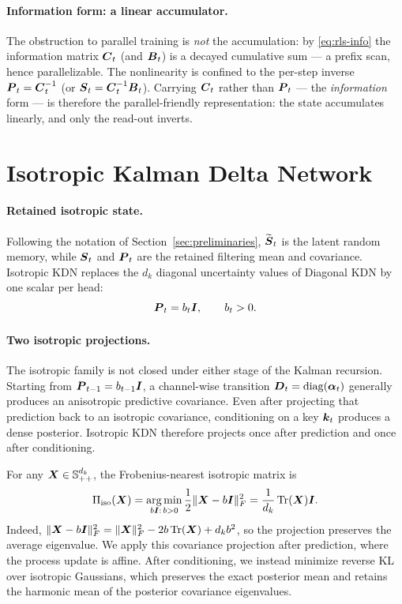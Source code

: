 \documentclass[11pt,letterpaper,logo]{yalearxiv}
\begin{document}
\paragraph{Information form: a linear accumulator.}
The obstruction to parallel training is \emph{not} the accumulation: by \eqref{eq:rls-info}
the information matrix $\boldsymbol{C}_t$ (and $\boldsymbol{B}_t$) is a decayed cumulative sum --- a prefix scan, hence
parallelizable. The nonlinearity is confined to the per-step inverse $\boldsymbol{P}_t=\boldsymbol{C}_t^{-1}$ (or
$\boldsymbol{S}_t=\boldsymbol{C}_t^{-1}\boldsymbol{B}_t$). Carrying $\boldsymbol{C}_t$ rather than $\boldsymbol{P}_t$ --- the \emph{information} form --- is
therefore the parallel-friendly representation: the state accumulates linearly, and only the
read-out inverts.
\fi

\section{Isotropic Kalman Delta Network}
\label{app:iso-kla}

\paragraph{Retained isotropic state.}
Following the notation of Section~\ref{sec:preliminaries},
$\widetilde{\boldsymbol{S}}_t$ is the latent random memory, while $\boldsymbol{S}_t$ and $\boldsymbol{P}_t$ are the retained
filtering mean and covariance. Isotropic KDN replaces the $d_k$ diagonal uncertainty values of
Diagonal KDN by one scalar per head:
\begin{equation}
  \boldsymbol{P}_t=b_t\boldsymbol{I},
  \qquad
  b_t>0.
  \label{eq:iso-cov-family}
\end{equation}

\paragraph{Two isotropic projections.}
The isotropic family is not closed under either stage of the Kalman recursion. Starting from
$\boldsymbol{P}_{t-1}=b_{t-1}\boldsymbol{I}$, a channel-wise transition
$\boldsymbol{D}_t=\operatorname{diag}(\boldsymbol{\alpha}_t)$ generally produces an anisotropic predictive covariance. Even
after projecting that prediction back to an isotropic covariance, conditioning on a key
$\boldsymbol{k}_t$ produces a dense posterior. Isotropic KDN therefore projects once after prediction and
once after conditioning.

For any $\boldsymbol{X}\in\mathbb{S}_{++}^{d_k}$, the Frobenius-nearest isotropic matrix is
\begin{equation}
  \Pi_{\mathrm{iso}}(\boldsymbol{X})
  =\operatorname*{arg\,min}_{b\boldsymbol{I}:\,b>0}\frac12\|\boldsymbol{X}-b\boldsymbol{I}\|_F^2
  =\frac{1}{d_k}\operatorname{Tr}(\boldsymbol{X})\boldsymbol{I}.
  \label{eq:iso-trace-projection}
\end{equation}
Indeed,
$\|\boldsymbol{X}-b\boldsymbol{I}\|_F^2
=\|\boldsymbol{X}\|_F^2-2b\operatorname{Tr}(\boldsymbol{X})+d_kb^2$, so the projection preserves the average eigenvalue. We
apply this covariance projection after prediction, where the process update is affine. After
conditioning, we instead minimize reverse KL over isotropic Gaussians, which preserves the exact
posterior mean and retains the harmonic mean of the posterior covariance eigenvalues.
\end{document}
